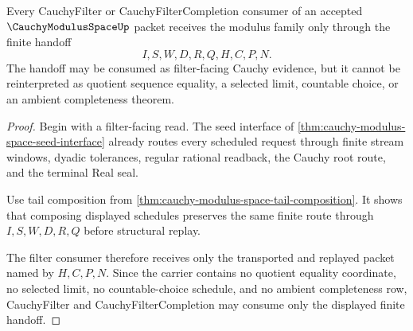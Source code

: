 \begin{theorem}
\label{thm:cauchy-modulus-space-filter-handoff}
Every CauchyFilter or CauchyFilterCompletion consumer of an accepted $\CauchyModulusSpaceUp$ packet receives the modulus family only through the finite handoff
$$
I,S,W,D,R,Q,H,C,P,N .
$$
The handoff may be consumed as filter-facing Cauchy evidence, but it cannot be reinterpreted as quotient sequence equality, a selected limit, countable choice, or an ambient completeness theorem.
\end{theorem}
\begin{proof}
Begin with a filter-facing read. The seed interface of \autoref{thm:cauchy-modulus-space-seed-interface} already routes every scheduled request through finite stream windows, dyadic tolerances, regular rational readback, the Cauchy root route, and the terminal Real seal.

Use tail composition from \autoref{thm:cauchy-modulus-space-tail-composition}. It shows that composing displayed schedules preserves the same finite route through $I,S,W,D,R,Q$ before structural replay.

The filter consumer therefore receives only the transported and replayed packet named by $H,C,P,N$. Since the carrier contains no quotient equality coordinate, no selected limit, no countable-choice schedule, and no ambient completeness row, CauchyFilter and CauchyFilterCompletion may consume only the displayed finite handoff.
\end{proof}

